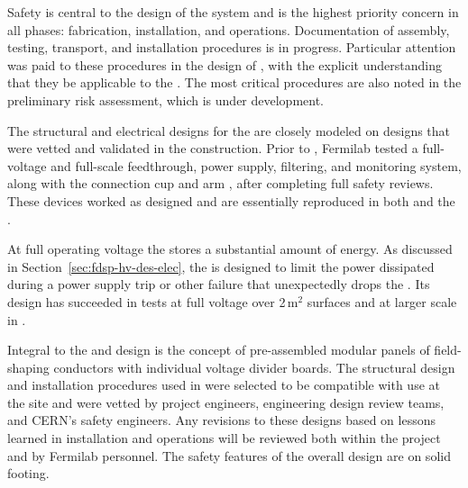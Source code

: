 Safety is central to the design of the  system and is the highest priority concern in all phases: fabrication, installation, and operations. Documentation of assembly, testing, transport, and installation procedures is in progress. Particular attention was paid to these procedures in the design of , with the explicit understanding that they be applicable to the . The most critical procedures are also noted in the preliminary  risk assessment, which is under development. %

The structural and electrical designs for the   are closely modeled on designs that were vetted and validated in the  construction. 
Prior to , Fermilab tested a full-voltage and full-scale  feedthrough, power supply, filtering, and monitoring system, along with the  connection cup and arm  %
, after completing full safety reviews. These devices worked as designed and are essentially reproduced in both  and the . 

At full operating voltage the  stores a substantial amount of energy.
As discussed in Section~\ref{sec:fdsp-hv-des-elec}, the  is designed to limit the power dissipated during a power supply trip or other failure that unexpectedly drops the .
Its design has succeeded in tests at full voltage over \num{2}\,m$^2$ surfaces and at larger scale in .  

Integral to the  and  design is the concept of pre-assembled modular panels of field-shaping conductors with individual voltage divider boards. The structural design and installation procedures used in  were selected to be compatible with use at the  site and were vetted by project engineers, engineering design review teams, and CERN's safety engineers. Any revisions to these designs based on lessons learned in   installation and operations will be reviewed both within the project and by Fermilab  personnel. The safety features of the overall design are on solid footing. 



